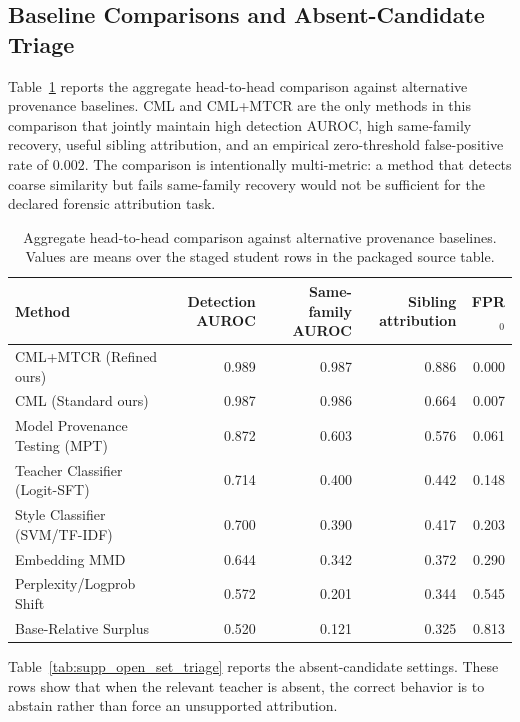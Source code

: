 \documentclass[onecolumn,journal]{IEEEtran}
\begin{document}
\subsection{Baseline Comparisons and Absent-Candidate Triage}
Table~\ref{tab:supp_baseline_head_to_head} reports the aggregate head-to-head
comparison against alternative provenance baselines. CML and CML+MTCR are the only
methods in this comparison that jointly maintain high detection AUROC, high
same-family recovery, useful sibling attribution, and an empirical zero-threshold
false-positive rate of $0.002$. The comparison is intentionally multi-metric: a method that
detects coarse similarity but fails same-family recovery would not be sufficient for
the declared forensic attribution task.

\begin{table}[!htbp]\centering\footnotesize
\caption{Aggregate head-to-head comparison against alternative provenance baselines. Values are means over the staged student rows in the packaged source table.}
\label{tab:supp_baseline_head_to_head}
\begin{tabular}{lrrrr}
\toprule
Method & Detection AUROC & Same-family AUROC & Sibling attribution & FPR$_0$ \\
\midrule
CML+MTCR (Refined ours) & 0.989 & 0.987 & 0.886 & 0.000 \\
CML (Standard ours) & 0.987 & 0.986 & 0.664 & 0.007 \\
Model Provenance Testing (MPT) & 0.872 & 0.603 & 0.576 & 0.061 \\
Teacher Classifier (Logit-SFT) & 0.714 & 0.400 & 0.442 & 0.148 \\
Style Classifier (SVM/TF-IDF) & 0.700 & 0.390 & 0.417 & 0.203 \\
Embedding MMD & 0.644 & 0.342 & 0.372 & 0.290 \\
Perplexity/Logprob Shift & 0.572 & 0.201 & 0.344 & 0.545 \\
Base-Relative Surplus & 0.520 & 0.121 & 0.325 & 0.813 \\
\bottomrule
\end{tabular}
\end{table}


Table~\ref{tab:supp_open_set_triage} reports the absent-candidate settings. These
rows show that when the relevant teacher is absent, the correct behavior is to
abstain rather than force an unsupported attribution.
\end{document}
